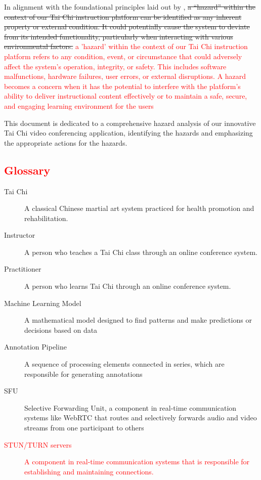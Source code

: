 \documentclass{article}
\begin{document}
In alignment with the foundational principles laid out by
\textcite{leveson_engineering_2011}, \sout{a ``hazard'' within the context of our Tai
Chi instruction platform can be identified as any inherent property or external
condition. It could potentially cause the system to deviate from its intended
functionality, particularly when interacting with various environmental factors.}
\textcolor{red}{a 'hazard' within the context of our Tai Chi instruction platform 
refers to any condition, event, or circumstance that could adversely affect the 
system’s operation, integrity, or safety. This includes software malfunctions, 
hardware failures, user errors, or external disruptions. A hazard becomes a concern 
when it has the potential to interfere with the platform’s ability to deliver 
instructional content effectively or to maintain a safe, secure, and engaging 
learning environment for the users}

This document is dedicated to a comprehensive hazard analysis of our innovative
Tai Chi video conferencing application, identifying the hazards and emphasizing
the appropriate actions for the hazards.

\subsection{\textcolor{red}{Glossary}}

\begin{description}
\item[Tai Chi] A classical Chinese martial art system practiced for health
  promotion and rehabilitation.
\item[Instructor] A person who teaches a Tai Chi class through an online conference
  system.
\item[Practitioner] A person who learns Tai Chi through an online conference
  system.
\item[Machine Learning Model] A mathematical model designed to find patterns and make predictions or decisions based on data
\item[Annotation Pipeline] A sequence of processing elements connected in series, which are responsible for generating annotations
\item[SFU] Selective Forwarding Unit, a component in real-time communication systems like WebRTC that routes and selectively forwards audio and video streams from one participant to others
\item[\textcolor{red}{STUN/TURN servers}] \textcolor{red}{A component in real-time communication systems that is responsible for establishing and maintaining connections.}
\end{description}
\end{document}

